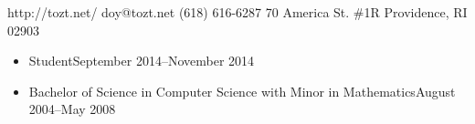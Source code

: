 \documentclass[letterpaper]{article}
\begin{document}
          {http://tozt.net/}
          {doy@tozt.net\hspace{0.5in}}
          {(618) 616-6287}
          {70 America St. \#1R}
          {Providence, RI 02903}
\begin{itemize}
    \item {}
                        {Student}{September 2014--November 2014}
    \item {}
                        {Bachelor of Science in Computer Science with Minor in Mathematics}{August 2004--May 2008}
        \begin{minipage}[t]{\textwidth/2-0.2in}
            \begin{itemize}
                \vspace{-7pt}
                \vspace{4pt}
            \end{itemize}
        \end{minipage}
        \begin{minipage}[t]{\textwidth/2-0.2in}
            \begin{itemize}
                \vspace{-7pt}
                \vspace{4pt}
            \end{itemize}
        \end{minipage}
\end{itemize}
\end{document}
